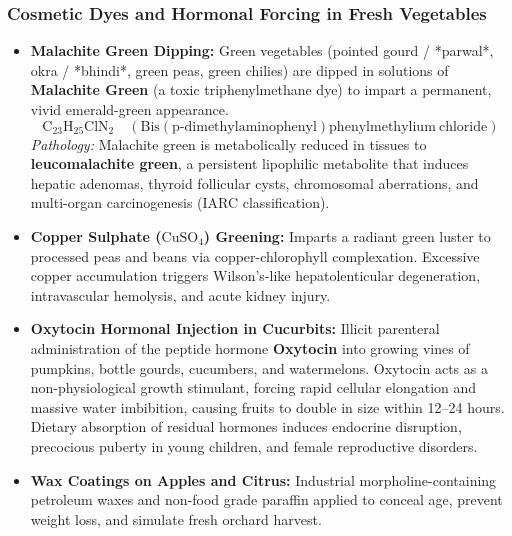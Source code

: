 \documentclass[11pt,a4paper,oneside]{article}
\begin{document}
\subsubsection{Cosmetic Dyes and Hormonal Forcing in Fresh Vegetables}
\begin{itemize}[leftmargin=*]
    \item \textbf{Malachite Green Dipping:} Green vegetables (pointed gourd / *parwal*, okra / *bhindi*, green peas, green chilies) are dipped in solutions of \textbf{Malachite Green} (a toxic triphenylmethane dye) to impart a permanent, vivid emerald-green appearance.
    $$\mathrm{C_{23}H_{25}ClN_2 \quad (Bis(p\text{-dimethylaminophenyl})phenylmethylium\ chloride)}$$
    \textit{Pathology:} Malachite green is metabolically reduced in tissues to \textbf{leucomalachite green}, a persistent lipophilic metabolite that induces hepatic adenomas, thyroid follicular cysts, chromosomal aberrations, and multi-organ carcinogenesis (IARC classification).
    \item \textbf{Copper Sulphate ($\mathrm{CuSO_4}$) Greening:} Imparts a radiant green luster to processed peas and beans via copper-chlorophyll complexation. Excessive copper accumulation triggers Wilson's-like hepatolenticular degeneration, intravascular hemolysis, and acute kidney injury.
    \item \textbf{Oxytocin Hormonal Injection in Cucurbits:} Illicit parenteral administration of the peptide hormone \textbf{Oxytocin} into growing vines of pumpkins, bottle gourds, cucumbers, and watermelons. Oxytocin acts as a non-physiological growth stimulant, forcing rapid cellular elongation and massive water imbibition, causing fruits to double in size within 12--24 hours. Dietary absorption of residual hormones induces endocrine disruption, precocious puberty in young children, and female reproductive disorders.
    \item \textbf{Wax Coatings on Apples and Citrus:} Industrial morpholine-containing petroleum waxes and non-food grade paraffin applied to conceal age, prevent weight loss, and simulate fresh orchard harvest.
\end{itemize}
\end{document}
